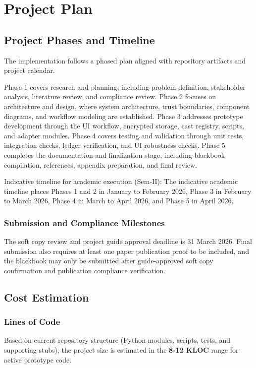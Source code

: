 \chapter{Project Plan}

\section{Project Phases and Timeline}
The implementation follows a phased plan aligned with repository artifacts and project calendar.

Phase 1 covers research and planning, including problem definition, stakeholder analysis, literature review, and compliance review. Phase 2 focuses on architecture and design, where system architecture, trust boundaries, component diagrams, and workflow modeling are established. Phase 3 addresses prototype development through the UI workflow, encrypted storage, cast registry, scripts, and adapter modules. Phase 4 covers testing and validation through unit tests, integration checks, ledger verification, and UI robustness checks. Phase 5 completes the documentation and finalization stage, including blackbook compilation, references, appendix preparation, and final review.

Indicative timeline for academic execution (Sem-II):
The indicative academic timeline places Phases 1 and 2 in January to February 2026, Phase 3 in February to March 2026, Phase 4 in March to April 2026, and Phase 5 in April 2026.

\subsection{Submission and Compliance Milestones}
The soft copy review and project guide approval deadline is 31 March 2026. Final submission also requires at least one paper publication proof to be included, and the blackbook may only be submitted after guide-approved soft copy confirmation and publication compliance verification.

\section{Cost Estimation}

\subsection{Lines of Code}
Based on current repository structure (Python modules, scripts, tests, and supporting stubs), the project size is estimated in the \textbf{8-12 KLOC} range for active prototype code.

